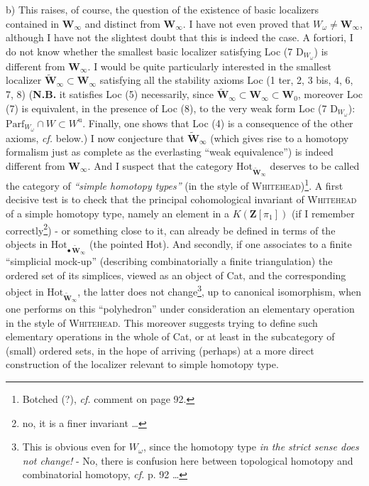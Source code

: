 \documentclass[11pt]{article}
\newcommand{\printedpage}[1]{\marginpar{\footnotesize p.~#1}}
\newcommand{\msp}[1]{\marginpar{\footnotesize [#1]}}
\begin{document}
b) This raises, of course, the question of the existence of basic localizers contained in $\mathbf{W}_\infty$ and
\msp{page 87}
distinct from $\mathbf{W}_\infty$. I have not even proved that $W_\omega \neq \mathbf{W}_\infty$, although I have not the slightest doubt that this is indeed the case. A fortiori, I do not know whether the smallest basic localizer satisfying Loc (7 D$_{W_\omega}$) is different from $\mathbf{W}_\infty$. I would be quite particularly interested in the smallest localizer $\tilde{\mathbf{W}}_\infty \subset \mathbf{W}_\infty$ satisfying all the stability axioms Loc (1 ter, 2, 3 bis, 4, 6, 7, 8) (\textbf{N.B.} it satisfies
\printedpage{46}
Loc (5) necessarily, since $\tilde{\mathbf{W}}_\infty \subset \mathbf{W}_\infty \subset \mathbf{W}_0$, moreover Loc (7) is equivalent, in the presence of Loc (8), to the very weak form Loc (7 D$_{W_\omega}$): $\mathrm{Parf}_{W_\omega} \cap W \subset W^{\mathrm{u}}$. Finally, one shows that Loc (4) is a consequence of the other axioms, \textit{cf.} below.) I now conjecture that $\tilde{\mathbf{W}}_\infty$ (which gives rise to a homotopy formalism just as complete as the everlasting ``weak equivalence'') is indeed different from $\mathbf{W}_\infty$. And I suspect
\msp{page 88}
that the category $\mathrm{Hot}_{\tilde{\mathbf{W}}_\infty}$ deserves to be called the category of \textit{``simple homotopy types''} (in the style of \textsc{Whitehead})\footnote[41]{Botched (?), \textit{cf.} comment on page 92.}. A first decisive test is to check that the principal cohomological invariant of \textsc{Whitehead} of a simple homotopy type, namely an element in a $K(\mathbf{Z}[\pi_1])$ (if I remember correctly\footnote[42]{no, it is a finer invariant \ldots}) - or something close to it, can already be defined in terms of the objects in $\mathrm{Hot}_{\bullet\,\tilde{\mathbf{W}}_\infty}$ (the pointed Hot). And secondly, if one associates to a finite ``simplicial mock-up'' (describing combinatorially a finite triangulation) the ordered set of its simplices, viewed as an object of Cat, and the corresponding object in $\mathrm{Hot}_{\tilde{\mathbf{W}}_\infty}$, the latter does not change\footnote[43]{This is obvious even for $W_\omega$, since the homotopy type \textit{in the strict sense does not change!} - No, there is confusion here between topological homotopy and combinatorial homotopy, \textit{cf.} p. 92 \ldots}, up to canonical isomorphism, when one performs on this ``polyhedron'' under consideration an ele\msp{page 89}mentary operation in the style of \textsc{Whitehead}. This moreover suggests trying to define such elementary operations in the whole of Cat, or at least in the subcategory of (small) ordered sets, in the hope of arriving (perhaps) at a more direct construction of the localizer relevant to simple homotopy type.
\end{document}
